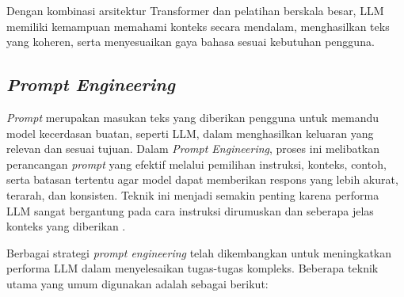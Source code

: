 Dengan kombinasi arsitektur Transformer dan pelatihan berskala besar, LLM memiliki kemampuan memahami konteks secara mendalam, menghasilkan teks yang koheren, serta menyesuaikan gaya bahasa sesuai kebutuhan pengguna.


\subsection{\textit{Prompt Engineering}}

\textit{Prompt} merupakan masukan teks yang diberikan pengguna untuk memandu model kecerdasan buatan, seperti LLM, dalam menghasilkan keluaran yang relevan dan sesuai tujuan. Dalam \textit{Prompt Engineering}, proses ini melibatkan perancangan \textit{prompt} yang efektif melalui pemilihan instruksi, konteks, contoh, serta batasan tertentu agar model dapat memberikan respons yang lebih akurat, terarah, dan konsisten. Teknik ini menjadi semakin penting karena performa LLM sangat bergantung pada cara instruksi dirumuskan dan seberapa jelas konteks yang diberikan \cite{Minaee2025PromptEngineering, White2023PromptPatternCatalog}.

Berbagai strategi \textit{prompt engineering} telah dikembangkan untuk meningkatkan performa LLM dalam menyelesaikan tugas-tugas kompleks. Beberapa teknik utama yang umum digunakan adalah sebagai berikut:

